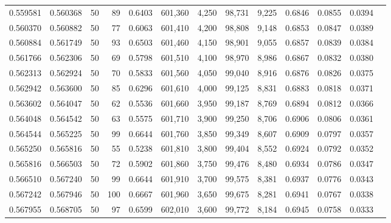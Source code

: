 \begin{tabular}{rrrrrrrrrrrrr}
0.559581 & 0.560368 &    50 &  89 &                                     0.6403 & 601,360 &   4,250 &  98,731 &   9,225 & 0.6846 & 0.0855 & 0.0394 \\
0.560370 & 0.560882 &    50 &  77 &                                     0.6063 & 601,410 &   4,200 &  98,808 &   9,148 & 0.6853 & 0.0847 & 0.0389 \\
0.560884 & 0.561749 &    50 &  93 &                                     0.6503 & 601,460 &   4,150 &  98,901 &   9,055 & 0.6857 & 0.0839 & 0.0384 \\
0.561766 & 0.562306 &    50 &  69 &                                     0.5798 & 601,510 &   4,100 &  98,970 &   8,986 & 0.6867 & 0.0832 & 0.0380 \\
0.562313 & 0.562924 &    50 &  70 &                                     0.5833 & 601,560 &   4,050 &  99,040 &   8,916 & 0.6876 & 0.0826 & 0.0375 \\
0.562942 & 0.563600 &    50 &  85 &                                     0.6296 & 601,610 &   4,000 &  99,125 &   8,831 & 0.6883 & 0.0818 & 0.0371 \\
0.563602 & 0.564047 &    50 &  62 &                                     0.5536 & 601,660 &   3,950 &  99,187 &   8,769 & 0.6894 & 0.0812 & 0.0366 \\
0.564048 & 0.564542 &    50 &  63 &                                     0.5575 & 601,710 &   3,900 &  99,250 &   8,706 & 0.6906 & 0.0806 & 0.0361 \\
0.564544 & 0.565225 &    50 &  99 &                                     0.6644 & 601,760 &   3,850 &  99,349 &   8,607 & 0.6909 & 0.0797 & 0.0357 \\
0.565250 & 0.565816 &    50 &  55 &                                     0.5238 & 601,810 &   3,800 &  99,404 &   8,552 & 0.6924 & 0.0792 & 0.0352 \\
0.565816 & 0.566503 &    50 &  72 &                                     0.5902 & 601,860 &   3,750 &  99,476 &   8,480 & 0.6934 & 0.0786 & 0.0347 \\
0.566510 & 0.567240 &    50 &  99 &                                     0.6644 & 601,910 &   3,700 &  99,575 &   8,381 & 0.6937 & 0.0776 & 0.0343 \\
0.567242 & 0.567946 &    50 & 100 &                                     0.6667 & 601,960 &   3,650 &  99,675 &   8,281 & 0.6941 & 0.0767 & 0.0338 \\
0.567955 & 0.568705 &    50 &  97 &                                     0.6599 & 602,010 &   3,600 &  99,772 &   8,184 & 0.6945 & 0.0758 & 0.0333 \\

\end{tabular}
